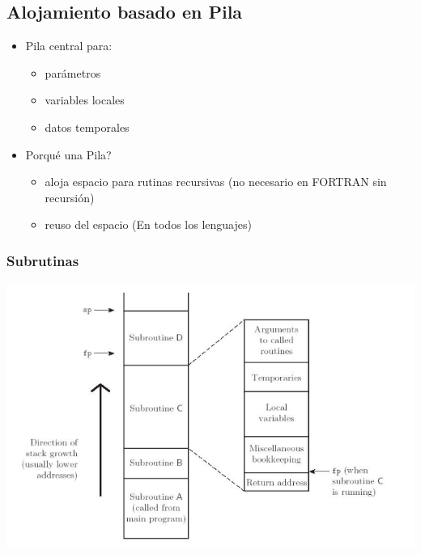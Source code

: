 \documentclass[11pt]{article}
\begin{document}
\subsection*{Alojamiento basado en Pila}
\label{sec:orgcf08940}

\begin{itemize}
\item Pila central para:
\begin{itemize}
\item parámetros
\item variables locales
\item datos temporales
\end{itemize}
\item Porqué una Pila?
\begin{itemize}
\item aloja espacio para rutinas recursivas (no necesario en FORTRAN sin recursión)
\item reuso del espacio (En todos los lenguajes)
\end{itemize}
\end{itemize}

\subsubsection*{Subrutinas}
\label{sec:orgcf4e82d}

\begin{center}
\includegraphics[width=.9\linewidth]{alojpilasubr.png}
\end{center}
\end{document}
